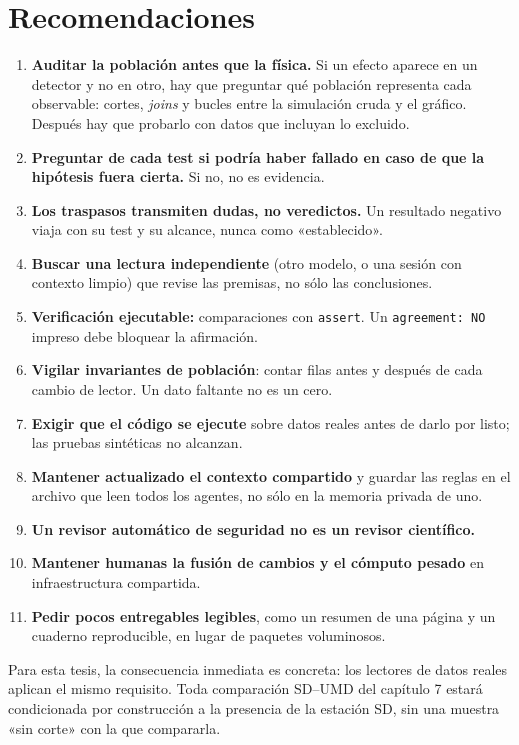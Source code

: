 \documentclass[11pt,a4paper]{article}
\newcommand{\code}[1]{\texttt{#1}}
\begin{document}
\section{Recomendaciones}
\begin{enumerate}
  \item \textbf{Auditar la población antes que la física.} Si un efecto aparece en un detector y no en otro,
  hay que preguntar qué población representa cada observable: cortes, \emph{joins} y bucles entre la
  simulación cruda y el gráfico. Después hay que probarlo con datos que incluyan lo excluido.
  \item \textbf{Preguntar de cada test si podría haber fallado en caso de que la hipótesis fuera cierta.} Si
  no, no es evidencia.
  \item \textbf{Los traspasos transmiten dudas, no veredictos.} Un resultado negativo viaja con su test y su
  alcance, nunca como «establecido».
  \item \textbf{Buscar una lectura independiente} (otro modelo, o una sesión con contexto limpio) que revise
  las premisas, no sólo las conclusiones.
  \item \textbf{Verificación ejecutable:} comparaciones con \code{assert}. Un \code{agreement: NO} impreso
  debe bloquear la afirmación.
  \item \textbf{Vigilar invariantes de población}: contar filas antes y después de cada cambio de lector. Un
  dato faltante no es un cero.
  \item \textbf{Exigir que el código se ejecute} sobre datos reales antes de darlo por listo; las pruebas
  sintéticas no alcanzan.
  \item \textbf{Mantener actualizado el contexto compartido} y guardar las reglas en el archivo que leen
  todos los agentes, no sólo en la memoria privada de uno.
  \item \textbf{Un revisor automático de seguridad no es un revisor científico.}
  \item \textbf{Mantener humanas la fusión de cambios y el cómputo pesado} en infraestructura compartida.
  \item \textbf{Pedir pocos entregables legibles}, como un resumen de una página y un cuaderno reproducible,
  en lugar de paquetes voluminosos.
\end{enumerate}
Para esta tesis, la consecuencia inmediata es concreta: los lectores de datos reales aplican el mismo
requisito. Toda comparación SD--UMD del capítulo 7 estará condicionada por construcción a la presencia de la
estación SD, sin una muestra «sin corte» con la que compararla.
\end{document}
